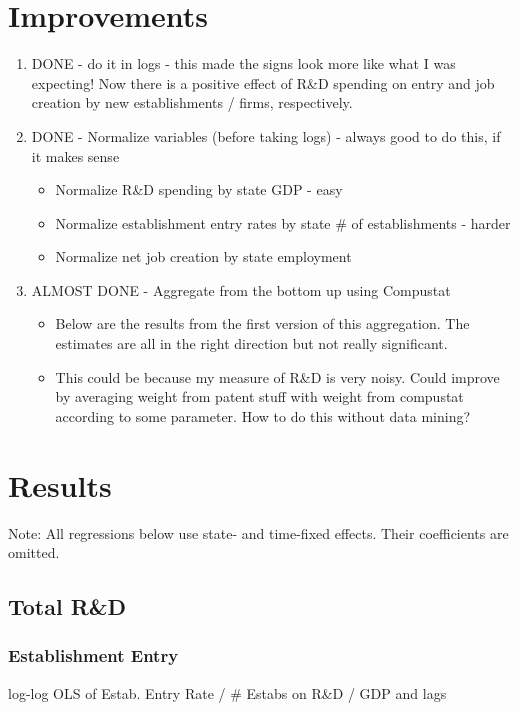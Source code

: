 \documentclass[7pt,english]{article}
\begin{document}
\section{Improvements}
\begin{enumerate}
	\item DONE - do it in logs - this made the signs look more like what I was expecting! Now there is a positive effect of R\&D spending on entry and job creation by new establishments / firms, respectively. 
	\item DONE - Normalize variables (before taking logs) - always good to do this, if it makes sense 
	\begin{itemize}
		\item Normalize R\&D spending by state GDP - easy
		\item Normalize establishment entry rates by state \# of establishments - harder
		\item Normalize net job creation by state employment
	\end{itemize}
	\item ALMOST DONE - Aggregate from the bottom up using Compustat 
	\begin{itemize}
		\item Below are the results from the first version of this aggregation. The estimates are all in the right direction but not really significant. 
		\item This could be because my measure of R\&D is very noisy. Could improve by averaging weight from patent stuff with weight from compustat according to some parameter. How to do this without data mining?
	\end{itemize}
\end{enumerate}


\section{Results}
Note: All regressions below use state- and time-fixed effects. Their coefficients are omitted. 
\subsection{Total R\&D}
\subsubsection{Establishment Entry}
\begin{table}[h!]
	\caption{log-log OLS of Estab. Entry Rate / \# Estabs on R\&D / GDP and lags}
	\center
	
\end{table}
\end{document}
